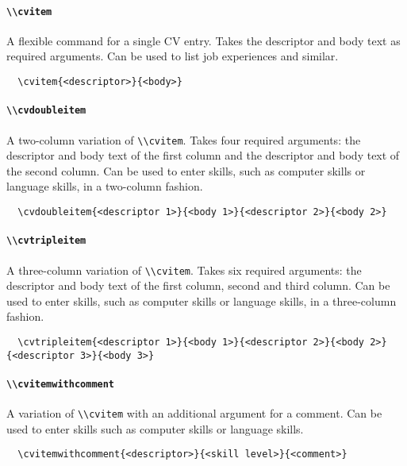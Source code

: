 \documentclass[a4paper, 11pt]{article}
\newcommand{\code}[1]{\lstinline!#1!}
\begin{document}
\paragraph{\code{\\cvitem}}
A flexible command for a single CV entry.
Takes the descriptor and body text as required arguments.
Can be used to list job experiences and similar.
\begin{lstlisting}
  \cvitem{<descriptor>}{<body>}
\end{lstlisting}

\paragraph{\code{\\cvdoubleitem}}
A two-column variation of \code{\\cvitem}.
Takes four required arguments: the descriptor and body text of the first column and the descriptor and body text of the second column.
Can be used to enter skills, such as computer skills or language skills, in a two-column fashion.
\begin{lstlisting}
  \cvdoubleitem{<descriptor 1>}{<body 1>}{<descriptor 2>}{<body 2>}
\end{lstlisting}

\paragraph{\code{\\cvtripleitem}}
A three-column variation of \code{\\cvitem}.
Takes six required arguments: the descriptor and body text of the first column, second and third column.
Can be used to enter skills, such as computer skills or language skills, in a three-column fashion.
\begin{lstlisting}
  \cvtripleitem{<descriptor 1>}{<body 1>}{<descriptor 2>}{<body 2>}{<descriptor 3>}{<body 3>}
\end{lstlisting}

\paragraph{\code{\\cvitemwithcomment}}
A variation of \code{\\cvitem} with an additional argument for a comment.
Can be used to enter skills such as computer skills or language skills.
\begin{lstlisting}
  \cvitemwithcomment{<descriptor>}{<skill level>}{<comment>}
\end{lstlisting}
\end{document}
